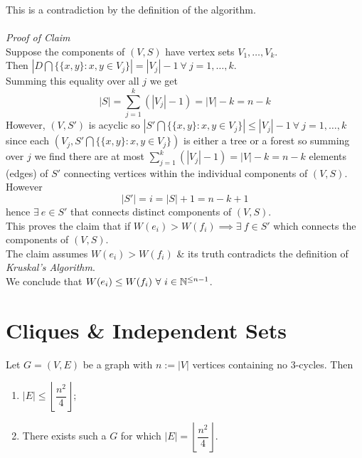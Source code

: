 \documentclass[11pt,a4paper]{article}
\begin{document}
This is a contradiction by the definition of the algorithm.\\
\\
\textit{Proof of Claim}\\
Suppose the components of $(V,S)$ have vertex sets $V_1,\dots,V_k$.\\
Then $|D\bigcap\{\{x,y\}:x,y\in V_j\}|=|V_j|-1\ \forall\ j=1,\dots,k$.\\
Summing this equality over all $j$ we get
$$|S|=\sum_{j=1}^k(|V_j|-1)=|V|-k=n-k$$
However, $(V,S')$ is acyclic so $|S'\bigcap\{\{x,y\}:x,y\in V_j\}|\leq |V_j|-1\ \forall\ j=1,\dots,k$\\
since each $(V_j,S'\bigcap\{\{x,y\}:x,y\in V_j\})$ is either a tree or a forest so summing over $j$ we find there are at most $\sum_{j=1}^k(|V_j|-1)=|V|-k=n-k$ elements (edges) of $S'$ connecting vertices within the individual components of $(V,S)$.\\
However
$$|S'|=i=|S|+1=n-k+1$$
hence $\exists\ e\in S'$ that connects distinct components of $(V,S)$.\\
This proves the claim that if $W(e_i)>W(f_i)\implies\exists\ f\in S'$ which connects the components of $(V,S)$.\\
The claim assumes $W(e_i)>W(f_i)$ \& its truth contradicts the definition of \textit{Kruskal's Algorithm}.\\
We conclude that $W(e_i)\leq W(f_i)\ \forall\ i\in\nats^{\leq n-1}$.

\section{Cliques \& Independent Sets}

Let $G=(V,E)$ be a graph with $n:=|V|$ vertices containing no 3-cycles. Then
\begin{enumerate}[label=\roman*)]
	\item $|E|\leq\left\lfloor\dfrac{n^2}{4}\right\rfloor$;
	\item There exists such a $G$ for which $|E|=\left\lfloor\dfrac{n^2}{4}\right\rfloor$.
\end{enumerate}
\end{document}
